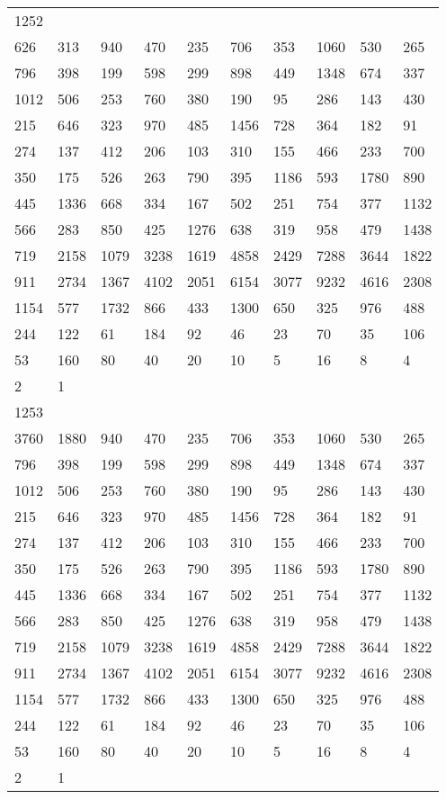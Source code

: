 \begin{longtable}{*{10}{l}}
1252&&&&&&&&&\\
626& 313& 940& 470& 235& 706& 353& 1060& 530& 265\\
796& 398& 199& 598& 299& 898& 449& 1348& 674& 337\\
1012& 506& 253& 760& 380& 190& 95& 286& 143& 430\\
215& 646& 323& 970& 485& 1456& 728& 364& 182& 91\\
274& 137& 412& 206& 103& 310& 155& 466& 233& 700\\
350& 175& 526& 263& 790& 395& 1186& 593& 1780& 890\\
445& 1336& 668& 334& 167& 502& 251& 754& 377& 1132\\
566& 283& 850& 425& 1276& 638& 319& 958& 479& 1438\\
719& 2158& 1079& 3238& 1619& 4858& 2429& 7288& 3644& 1822\\
911& 2734& 1367& 4102& 2051& 6154& 3077& 9232& 4616& 2308\\
1154& 577& 1732& 866& 433& 1300& 650& 325& 976& 488\\
244& 122& 61& 184& 92& 46& 23& 70& 35& 106\\
53& 160& 80& 40& 20& 10& 5& 16& 8& 4\\
2& 1& \\

1253&&&&&&&&&\\
3760& 1880& 940& 470& 235& 706& 353& 1060& 530& 265\\
796& 398& 199& 598& 299& 898& 449& 1348& 674& 337\\
1012& 506& 253& 760& 380& 190& 95& 286& 143& 430\\
215& 646& 323& 970& 485& 1456& 728& 364& 182& 91\\
274& 137& 412& 206& 103& 310& 155& 466& 233& 700\\
350& 175& 526& 263& 790& 395& 1186& 593& 1780& 890\\
445& 1336& 668& 334& 167& 502& 251& 754& 377& 1132\\
566& 283& 850& 425& 1276& 638& 319& 958& 479& 1438\\
719& 2158& 1079& 3238& 1619& 4858& 2429& 7288& 3644& 1822\\
911& 2734& 1367& 4102& 2051& 6154& 3077& 9232& 4616& 2308\\
1154& 577& 1732& 866& 433& 1300& 650& 325& 976& 488\\
244& 122& 61& 184& 92& 46& 23& 70& 35& 106\\
53& 160& 80& 40& 20& 10& 5& 16& 8& 4\\
2& 1& \\


\end{longtable}
